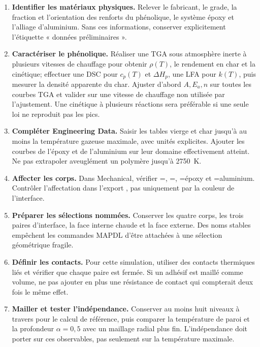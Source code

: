 \documentclass[oneside,openany]{amsdtx}
\begin{document}
\begin{enumerate}[leftmargin=2.2em,label=\textbf{\arabic*.}]
  \item \textbf{Identifier les matériaux physiques.} Relever le fabricant, le
  grade, la fraction et l'orientation des renforts du phénolique, le système
  époxy et l'alliage d'aluminium. Sans ces informations, conserver explicitement
  l'étiquette « données préliminaires ».

  \item \textbf{Caractériser le phénolique.} Réaliser une TGA sous atmosphère
  inerte à plusieurs vitesses de chauffage pour obtenir \(\rho(T)\), le rendement
  en char et la cinétique; effectuer une DSC pour \(c_p(T)\) et
  \(\Delta H_p\), une LFA pour \(k(T)\), puis mesurer la densité apparente du
  char. Ajuster d'abord \(A,E_a,n\) sur toutes les courbes TGA et valider sur une
  vitesse de chauffage non utilisée par l'ajustement. Une cinétique à plusieurs
  réactions sera préférable si une seule loi ne reproduit pas les pics.

  \item \textbf{Compléter Engineering Data.} Saisir les tables vierge et char
  jusqu'à au moins la température gazeuse maximale, avec unités explicites.
  Ajouter les courbes de l'époxy et de l'aluminium sur leur domaine effectivement
  atteint. Ne pas extrapoler aveuglément un polymère jusqu'à \SI{2750}{K}.

  \item \textbf{Affecter les corps.} Dans Mechanical, vérifier
  =,
  =, =époxy et
  =aluminium. Contrôler l'affectation dans l'export , pas
  uniquement par la couleur de l'interface.

  \item \textbf{Préparer les sélections nommées.} Conserver les quatre corps,
  les trois paires d'interface, la face interne chaude et la face externe. Des
  noms stables empêchent les commandes MAPDL d'être attachées à une sélection
  géométrique fragile.

  \item \textbf{Définir les contacts.} Pour cette simulation, utiliser des
  contacts thermiques liés et vérifier que chaque paire est fermée. Si un
  adhésif est maillé comme volume, ne pas ajouter en plus une résistance de
  contact qui compterait deux fois le même effet.

  \item \textbf{Mailler et tester l'indépendance.} Conserver au moins huit
  niveaux à travers  pour le calcul de référence, puis comparer la
  température de paroi et la profondeur \(\alpha=0{,}5\) avec un maillage radial
  plus fin. L'indépendance doit porter sur ces observables, pas seulement sur la
  température maximale.


\end{enumerate}
\end{document}
